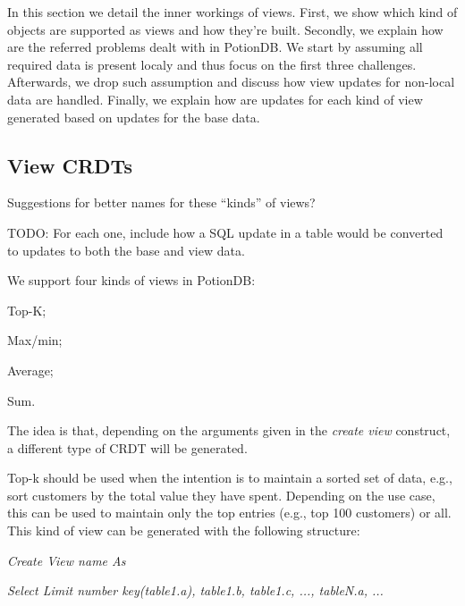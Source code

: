 \documentclass{vldb}
\newcommand{\grumbler}[2]{{\color{red}{\bf #1:} #2}}
\newcommand{\andre}[1]{\grumbler{andre}{#1}}
\newcommand{\emphvspace}{0.5\baselineskip}
\newcommand{\firstblockemph}[1]{\vspace{\emphvspace}\hspace{2em}\emph{#1}}
\newcommand{\middleblockemph}[1]{\hspace{2em}\emph{#1}}
\begin{document}
In this section we detail the inner workings of views.
First, we show which kind of objects are supported as views and how they're built.
Secondly, we explain how are the referred problems dealt with in PotionDB.
We start by assuming all required data is present localy and thus focus on the first three challenges.
Afterwards, we drop such assumption and discuss how view updates for non-local data are handled.
Finally, we explain how are updates for each kind of view generated based on updates for the base data.


\subsection{View CRDTs}

\andre{Suggestions for better names for these ``kinds'' of views?}

\andre{TODO: For each one, include how a SQL update in a table would be converted to updates to both the base and view data.}

We support four kinds of views in PotionDB:
\begin{enumerate*}[label=(\roman*)]
	\item Top-K;
	\item Max/min;
	\item Average;
	\item Sum.
\end{enumerate*}
The idea is that, depending on the arguments given in the \emph{create view} construct, a different type of CRDT will be generated.

Top-k should be used when the intention is to maintain a sorted set of data, e.g., sort customers by the total value they have spent.
Depending on the use case, this can be used to maintain only the top entries (e.g., top 100 customers) or all.
This kind of view can be generated with the following structure:

\firstblockemph{Create View name As}

\middleblockemph{Select Limit number key(table1.a), table1.b, table1.c, ..., tableN.a, ...}
\end{document}
